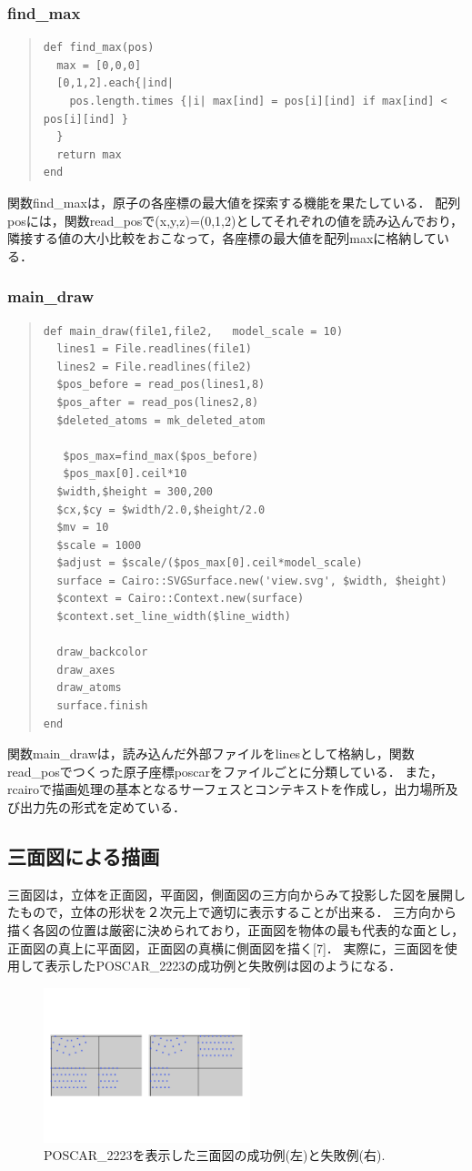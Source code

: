\subsubsection{find\_max}\begin{quote}\begin{verbatim}
def find_max(pos)
  max = [0,0,0]
  [0,1,2].each{|ind|
    pos.length.times {|i| max[ind] = pos[i][ind] if max[ind] < pos[i][ind] }
  }
  return max
end
\end{verbatim}\end{quote}
関数find\_maxは，原子の各座標の最大値を探索する機能を果たしている．
配列posには，関数read\_posで(x,y,z)=(0,1,2)としてそれぞれの値を読み込んでおり，隣接する値の大小比較をおこなって，各座標の最大値を配列maxに格納している．

\subsubsection{main\_draw}\begin{quote}\begin{verbatim}
def main_draw(file1,file2,   model_scale = 10)
  lines1 = File.readlines(file1)
  lines2 = File.readlines(file2)
  $pos_before = read_pos(lines1,8)
  $pos_after = read_pos(lines2,8)
  $deleted_atoms = mk_deleted_atom

   $pos_max=find_max($pos_before)
   $pos_max[0].ceil*10
  $width,$height = 300,200
  $cx,$cy = $width/2.0,$height/2.0
  $mv = 10
  $scale = 1000
  $adjust = $scale/($pos_max[0].ceil*model_scale)
  surface = Cairo::SVGSurface.new('view.svg', $width, $height)
  $context = Cairo::Context.new(surface)
  $context.set_line_width($line_width)

  draw_backcolor
  draw_axes
  draw_atoms
  surface.finish
end
\end{verbatim}\end{quote}
関数main\_drawは，読み込んだ外部ファイルをlinesとして格納し，関数read\_posでつくった原子座標poscarをファイルごとに分類している．
また，rcairoで描画処理の基本となるサーフェスとコンテキストを作成し，出力場所及び出力先の形式を定めている．

\subsection{三面図による描画}
三面図は，立体を正面図，平面図，側面図の三方向からみて投影した図を展開したもので，立体の形状を２次元上で適切に表示することが出来る．
三方向から描く各図の位置は厳密に決められており，正面図を物体の最も代表的な面とし，正面図の真上に平面図，正面図の真横に側面図を描く[7]．
実際に，三面図を使用して表示したPOSCAR\_2223の成功例と失敗例は図のようになる．

\begin{figure}[htbp]\begin{center}
\includegraphics[width=6cm,bb=0 0 442 432]{../figs/./boundary_narita.014.jpg}
\caption{POSCAR\_2223を表示した三面図の成功例(左)と失敗例(右).}
\label{default}\end{center}\end{figure}
